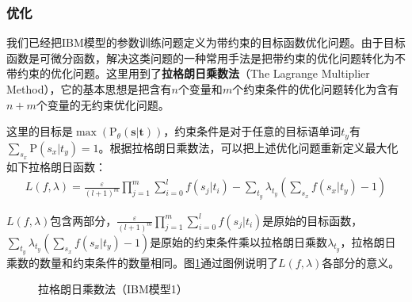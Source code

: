 
\subsubsection {优化}

\parinterval 我们已经把IBM模型的参数训练问题定义为带约束的目标函数优化问题。由于目标函数是可微分函数，解决这类问题的一种常用手法是把带约束的优化问题转化为不带约束的优化问题。这里用到了{\small\sffamily\bfseries{拉格朗日乘数法}}（The Lagrange Multiplier Method），它的基本思想是把含有$n$个变量和$m$个约束条件的优化问题转化为含有$n+m$个变量的无约束优化问题。

\parinterval 这里的目标是$\max(\textrm{P}_{\theta}(\mathbf{s}|\mathbf{t}))$，约束条件是对于任意的目标语单词$t_y$有\\$\sum_{s_x}{\textrm{P}(s_x|t_y)}=1$。根据拉格朗日乘数法，可以把上述优化问题重新定义最大化如下拉格朗日函数：
\vspace{-0.5em}
\begin{eqnarray}
L(f,\lambda)=\frac{\varepsilon}{(l+1)^m}\prod_{j=1}^{m}\sum_{i=0}^{l}{f(s_j|t_i)}-\sum_{t_y}{\lambda_{t_y}(\sum_{s_x}{f(s_x|t_y)}-1)}
\label{eq:3-32}
\end{eqnarray}

\vspace{-0.3em}
\parinterval $L(f,\lambda)$包含两部分，$\frac{\varepsilon}{(l+1)^m}\prod_{j=1}^{m}\sum_{i=0}^{l}{f(s_j|t_i)}$是原始的目标函数，\\$\sum_{t_y}{\lambda_{t_y}(\sum_{s_x}{f(s_x|t_y)}-1)}$是原始的约束条件乘以拉格朗日乘数$\lambda_{t_y}$，拉格朗日乘数的数量和约束条件的数量相同。图\ref{fig:3-23}通过图例说明了$L(f,\lambda)$各部分的意义。

\begin{figure}[htp]
    \centering

   \caption{拉格朗日乘数法（IBM模型1）}
   \label{fig:3-23}
\end{figure}

